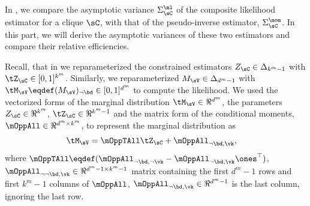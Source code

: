 \subsection{}
\label{app:pw-proof}

In , we compare the asymptotic variance
  $\Sigma^\ml_\sC$ of the composite likelihood estimator for a clique
  $\sC$, with that of the pseudo-inverse estimator, $\Sigma^\mom_\sC$. 
In this part, we will derive the asymptotic variances of these two
  estimators and compare their relative efficiencies.

Recall, that in  we reparameterized the
  constrained estimators $Z_\sC \in \Delta_{k^m-1}$ with $\tZ_\sC \in
  [0,1]^{k^m}$. 
Similarly, we reparameterized $M_\sV \in \Delta_{d^m - 1}$ with
  $\tM_\sV \eqdef (M_\sV)_{\neg \bd} \in [0,1]^{d^m}$ to compute
  the likelihood.
We used the vectorized forms of the marginal distribution $\tM_\sV \in
  \Re^{d^m}$, the parameters $Z_\sC \in \Re^{k^m}$, $\tZ_\sC \in
  \Re^{k^m-1}$ and the matrix form of the conditional moments, $\mOppAll
  \in \Re^{d^m \times k^m}$, to represent the marginal distribution as
\begin{align*}
  \tM_\sV &= \mOppTAll \tZ_\sC + \mOppAll_{\neg \bd, \vk},
\end{align*}
where $\mOppTAll \eqdef (\mOppAll_{\neg \bd, \neg \vk}
- \mOppAll_{\neg \bd, \vk}\ones^\top)$, $\mOppAll_{\neg \neg \bd, \vk} \in \Re^{d^m - 1 \times
k^m - 1}$ matrix containing the first $d^m-1$ rows and first $k^m-1$ columns of $\mOppAll$,
$\mOppAll_{\neg \bd, \vk} \in \Re^{d^m-1}$ is the last column, ignoring the last row.

